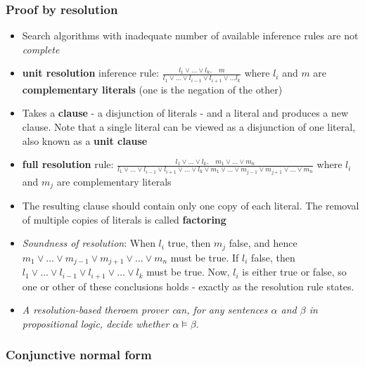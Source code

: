 \documentclass{scrartcl}
\newcommand{\ffrac}[2]{\ensuremath{\frac{\displaystyle #1}{\displaystyle #2}}}
\begin{document}
\subsubsection{Proof by resolution}
\begin{itemize}
    \item
        Search algorithms with inadequate number of available inference rules are not \textit{complete} 
    \item
        \textbf{unit resolution} inference rule: $\ffrac{l_{1} \lor \dots \lor l_{k}, \;\;\; m}{l_{1} \lor \dots \lor l_{i-1} \lor l_{i+1} \lor \dots l_{k}}$
        where $l_{i}$ and $m$ are \textbf{complementary literals} (one is the negation of the other)
    \item
        Takes a \textbf{clause} - a disjunction of literals - and a literal and produces a new clause. Note that a single literal can be viewed as a disjunction of one literal, also known as a \textbf{unit clause}
    \item
        \textbf{full resolution} rule: $\ffrac{l_{1} \lor \dots \lor l_{k}, \;\;\; m_{1} \lor \dots \lor m_{n}}{l_{1} \lor \dots \lor l_{i-1} \lor l_{i+1} \lor \dots \lor l_{k} \lor m_{1} \lor \dots \lor m_{j-1} \lor m_{j+1} \lor \dots \lor m_{n}}$
        where $l_{i}$ and $m_{j}$ are complementary literals
    \item
        The resulting clause should contain only one copy of each literal. The removal of multiple copies of literals is called \textbf{factoring}
    \item
        \textit{Soundness of resolution}: When $l_{i}$ true, then $m_{j}$ false, and hence $m_{1} \lor \dots \lor m_{j-1} \lor m_{j+1} \lor \dots \lor m_{n}$ must be true.
        If $l_{i}$ false, then $l_{1} \lor \dots \lor l_{i-1} \lor l_{i+1} \lor \dots \lor l_{k}$ must be true. Now, $l_{i}$ is either true or false, so one or other of these conclusions holds - exactly as the resolution rule states.
    \item
        \textit{A resolution-based theroem prover can, for any sentences $\alpha$ and $\beta$ in propositional logic, decide whether $\alpha \vDash \beta$}.
\end{itemize}

\subsubsection{Conjunctive normal form}
\end{document}
